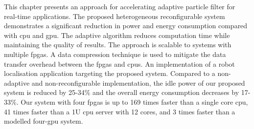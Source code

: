 This chapter presents an approach for accelerating adaptive particle filter for real-time applications.
The proposed heterogeneous reconfigurable system demonstrates a significant reduction in power and energy consumption compared with \gls{cpu} and \gls{gpu}.
The adaptive algorithm reduces computation time while maintaining the quality of results. 
The approach is scalable to systems with multiple \glspl{fpga}.
A data compression technique is used to mitigate the data transfer overhead between the \glspl{fpga} and \glspl{cpu}.
An implementation of a robot localisation application targeting the proposed system. 
Compared to a non-adaptive and non-reconfigurable implementation, the idle power of our proposed system is reduced by 25-34\% and the overall energy consumption decreases by 17-33\%.
Our system with four \glspl{fpga} is up to 169 times faster than a single core \gls{cpu}, 41 times faster than a 1U \gls{cpu} server with 12 cores, and 3 times faster than a modelled four-\gls{gpu} system.


